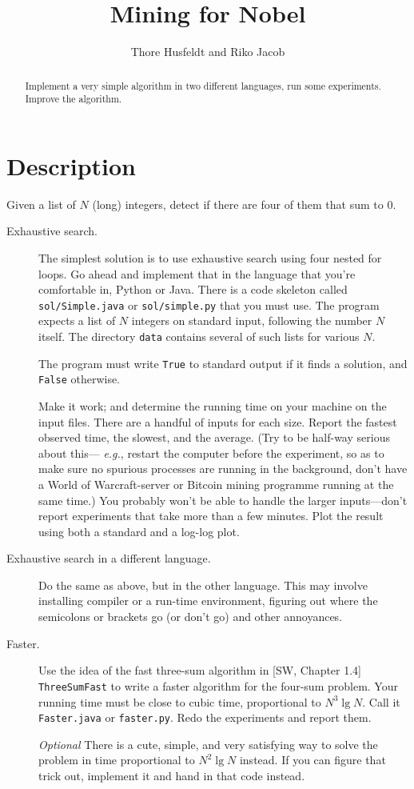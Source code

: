 \documentclass{tufte-handout}
\title{Mining for Nobel}
\author{Thore Husfeldt and Riko Jacob}
\begin{document}
\maketitle
\begin{abstract}
  Implement a very simple algorithm in two different languages, run some experiments.
  Improve the algorithm.
\end{abstract}


 \section{Description}

 Given a list of $N$ (long) integers, detect if there are four of them that sum to $0$.

\begin{description}
  \item[Exhaustive search.]
The simplest solution is to use exhaustive search using four nested for loops.
Go ahead and implement that in the language that you’re comfortable in, Python or Java.
There is a code skeleton called \texttt{sol/Simple.java} or \texttt{sol/simple.py} that you must use.
The program expects a list of $N$ integers on standard input, following the number $N$ itself.
The directory \texttt{data} contains several of such lists for various $N$.

The program must write \texttt{True} to standard output if it finds a solution, and \texttt{False} otherwise.

Make it work; and determine the running time on your machine on the input files. 
There are a handful of inputs for each size.
Report the fastest observed time, the slowest, and the average.
(Try to be half-way serious about this--- \emph{e.g.}, restart the computer before the experiment, so as to make sure no spurious processes are running in the background, don’t have a World of Warcraft-server or Bitcoin mining programme running at the same time.)
You probably won’t be able to handle the larger inputs---don’t report experiments that take more than a few minutes.
Plot the result using both a standard and a log-log plot.

\item[Exhaustive search in a different language.]
  Do the same as above, but in the other language.
  This may involve installing compiler or a run-time environment, figuring out where the semicolons or brackets go (or don’t go) and other annoyances.

\item[Faster.]
  Use the idea of the fast three-sum algorithm in [SW, Chapter 1.4] \texttt{
  ThreeSumFast} to write a faster algorithm for the four-sum problem.
  Your running time must be close to cubic time, proportional to $N^3\operatorname{lg} N$.
  Call it \texttt{Faster.java}  or \texttt{faster.py}.
  Redo the experiments and report them.

  \emph{Optional} There is a cute, simple, and very satisfying way to solve the problem in time proportional to $N^2\operatorname{lg} N$ instead.
If you can figure that trick out, implement it and hand in that code instead.
\end{description}
\end{document}
